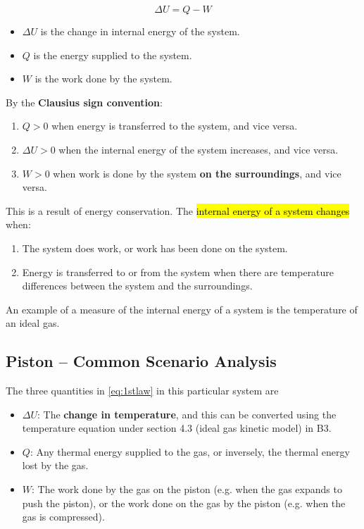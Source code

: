 \documentclass[a4paper,12pt]{article}
\begin{document}
\begin{law}
  \begin{equation}\label{eq:1stlaw}
    \Delta U = Q - W
  \end{equation}
  \begin{itemize}
    \item $\Delta U$ is the change in internal energy of the system.
    \item $Q$ is the energy supplied to the system.
    \item $W$ is the work done by the system.
  \end{itemize}
  By the \textbf{Clausius sign convention}:
  \begin{enumerate}
    \item $Q > 0$ when energy is transferred to the system, and vice versa.
    \item $\Delta U > 0$ when the internal energy of the system increases, and vice versa.
    \item $W > 0$ when work is done by the system \textbf{on the surroundings}, and vice versa.
  \end{enumerate}
\end{law}

This is a result of energy conservation. The \hl{internal energy of a system changes} when:
\begin{enumerate}
  \item The system does work, or work has been done on the system.
  \item Energy is transferred to or from the system when there are temperature differences between the system and the surroundings.
\end{enumerate}
An example of a measure of the internal energy of a system is the temperature of an ideal gas.

\pagebreak

\subsection{Piston -- Common Scenario Analysis}

The three quantities in \cref{eq:1stlaw} in this particular system are
\begin{itemize}
  \item $\Delta U$: The \textbf{change in temperature}, and this can be converted using the temperature equation under section 4.3 (ideal gas kinetic model) in B3.
  \item $Q$: Any thermal energy supplied to the gas, or inversely, the thermal energy lost by the gas.
  \item $W$: The work done by the gas on the piston (e.g. when the gas expands to push the piston), or the work done on the gas by the piston (e.g. when the gas is compressed).
\end{itemize}
\end{document}
